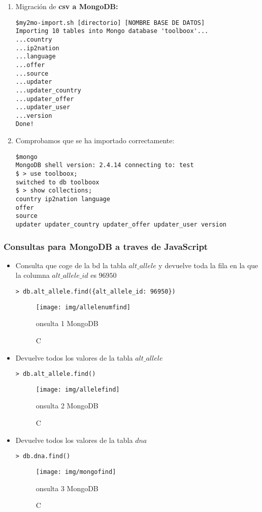 \documentclass[12pt,a4paper]{article}
\begin{document}
\begin{enumerate}
\item Migración de \textbf{csv a MongoDB:}
\begin{verbatim} 
$my2mo-import.sh [directorio] [NOMBRE BASE DE DATOS]
Importing 10 tables into Mongo database 'toolboox'...
...country
...ip2nation
...language
...offer
...source
...updater
...updater_country
...updater_offer
...updater_user
...version
Done!
\end{verbatim}

\item Comprobamos que se ha importado correctamente:
\begin{verbatim} 
$mongo
MongoDB shell version: 2.4.14 connecting to: test
$ > use toolboox;
switched to db toolboox
$ > show collections;
country ip2nation language
offer
source
updater updater_country updater_offer updater_user version
\end{verbatim}

\end{enumerate}



\subsubsection{Consultas para MongoDB a traves de JavaScript} \label{pto522}

\begin{itemize}
\item Consulta que coge de la bd la tabla $alt\_allele$ y devuelve toda la fila en la que la columna $alt\_allele\_id$ es $96950$
 
\verb|> db.alt_allele.find({alt_allele_id: 96950})|

\begin{figure}[!h]
\centering
\texttt{[image: img/allelenumfind]}
\caption Consulta 1 MongoDB
\label{mongo1}
\end{figure}

\item Devuelve todos los valores de la tabla  $alt\_allele$ 

\verb|> db.alt_allele.find()|

\begin{figure}[!h]
\centering
\texttt{[image: img/allelefind]}
\caption Consulta 2 MongoDB
\label{mongo2}
\end{figure}


\item Devuelve todos los valores de la tabla  $dna$ 

\verb|> db.dna.find()|

\begin{figure}[!h]
\centering
\texttt{[image: img/mongofind]}
\caption Consulta 3 MongoDB
\label{mongo3}
\end{figure}
\end{itemize}
\end{document}
